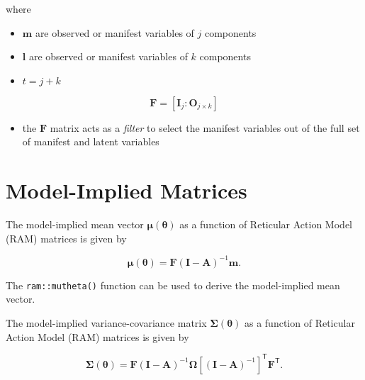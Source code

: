 \documentclass[
]{book}
\providecommand{\tightlist}{%
  \setlength{\itemsep}{0pt}\setlength{\parskip}{0pt}}
\begin{document}
\noindent where

\begin{itemize}
\tightlist
\item
  \(\mathbf{m}\) are observed or manifest variables of \(j\) components
\item
  \(\mathbf{l}\) are observed or manifest variables of \(k\) components
\item
  \(t = j + k\)
\end{itemize}

\begin{equation}
  \mathbf{F}
  =
  \left[
    \mathbf{I}_{j} \colon \mathbf{O}_{j \times k}
  \right]
\end{equation}

\begin{itemize}
\tightlist
\item
  the \(\mathbf{F}\) matrix acts as a \emph{filter} to select the manifest variables
  out of the full set of manifest and latent variables
\end{itemize}

\hypertarget{model-implied-matrices}{%
\section{Model-Implied Matrices}\label{model-implied-matrices}}

The model-implied mean vector
\(\boldsymbol{\mu} \left( \boldsymbol{\theta} \right)\)
as a function of Reticular Action Model (RAM) matrices
is given by

\begin{equation}
  \boldsymbol{\mu} \left( \boldsymbol{\theta} \right)
  =
  \mathbf{F}
  \left( \mathbf{I} - \mathbf{A} \right)^{-1}
  \mathbf{m} .
\end{equation}

\noindent The \texttt{ram::mutheta()} function can be used
to derive the model-implied mean vector.

The model-implied variance-covariance matrix
\(\boldsymbol{\Sigma} \left( \boldsymbol{\theta} \right)\)
as a function of Reticular Action Model (RAM) matrices
is given by

\begin{equation}
  \boldsymbol{\Sigma} \left( \boldsymbol{\theta} \right)
  =
  \mathbf{F}
  \left( \mathbf{I} - \mathbf{A} \right)^{-1}
  \boldsymbol{\Omega}
  \left[ \left( \mathbf{I} - \mathbf{A} \right)^{-1} \right]^{\mathsf{T}}
  \mathbf{F}^{\mathsf{T}} .
\end{equation}
\end{document}
